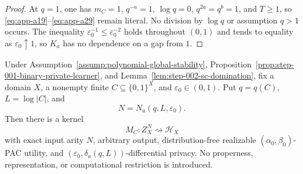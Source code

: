 \begin{proof}
At \(q=1\), one has \(m_C=1\), \(q^{-a}=1\),
\(\log q=0\), \(q^{2a}=q^b=1\), and \(T\geq1\), so
\eqref{eq:app-a19}--\eqref{eq:app-a29} remain literal.  No division by \(\log q\) or
assumption \(q>1\) occurs.  The inequality
\(\varepsilon_0^{-1}\leq\varepsilon_0^{-2}\) holds throughout
\((0,1)\) and tends to equality as \(\varepsilon_0\uparrow1\), so
\(K_a\) has no dependence on a gap from \(1\).
\end{proof}

\begin{proposition}
\label{prop:step-002-exact-padding}
Under Assumption~\ref{assump:polynomial-global-stability},
Proposition~\ref{prop:step-001-binary-private-learner}, and
Lemma~\ref{lem:step-002-sc-domination}, fix a domain \(X\), a
nonempty finite \(C\subseteq\{0,1\}^X\), and
\(\varepsilon_0\in(0,1)\).  Put \(q=q(C)\), \(L=\log|C|\), and
\[
N=N_a(q,L,\varepsilon_0).
\]
Then there is a kernel
\[
M_C:Z_X^N\rightsquigarrow\mathcal H_X
\]
with exact input arity \(N\), arbitrary output, distribution-free
realizable \((\alpha_0,\beta_0)\)-PAC utility, and
\((\varepsilon_0,\delta_a(q,L))\)-differential privacy.
No properness, representation, or computational restriction is
introduced.
\end{proposition}

